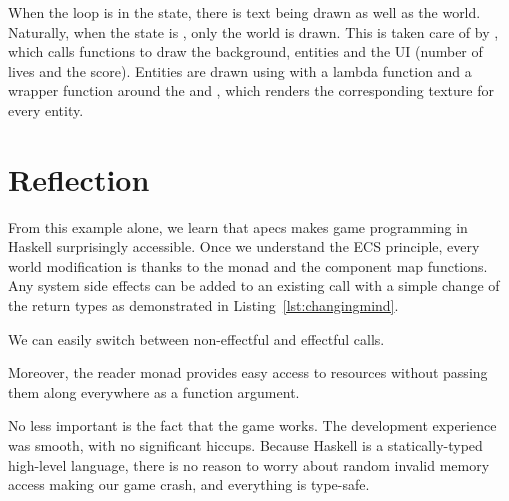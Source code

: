 \documentclass[
  digital, %
  color,   %
  table,   %
  oneside, %
  lof,     %
  lot,     %
]{fithesis3}
\begin{document}
When the loop is in the  state, there is text being drawn
as well as the world. Naturally, when the state is ,
only the world is drawn. This is taken care of by ,
which calls functions to draw the background, entities and the UI
(number of lives and the score). Entities are drawn using 
with a lambda function and a wrapper function around the  and
, which renders the corresponding texture for every entity.


\section{Reflection}
\label{sect:apecsreflection}

From this example alone,
we learn that apecs makes game programming in Haskell surprisingly accessible.
Once we understand the ECS principle, every world modification is
 thanks to the  monad and
the component map functions. Any system side effects can be added
to an existing  call with a simple change of the return types
as demonstrated in Listing~\ref{lst:changingmind}.
\begin{listing}[H]
\caption{We can easily switch between non-effectful and effectful calls.}
\label{lst:changingmind}
\end{listing}

Moreover, the  reader monad provides easy
access to resources without passing them along everywhere as a function argument.

No less important is the fact that the game works.
The development experience was smooth, with no significant hiccups.
Because Haskell is a statically-typed high-level language, there is
no reason to worry about random invalid memory access making our game crash,
and everything is type-safe.
\end{document}
